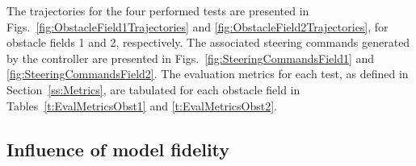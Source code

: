 \documentclass[12pt,twocolumn]{article}
\begin{document}
The trajectories for the four performed tests are presented in Figs.~\ref{fig:ObstacleField1Trajectories} and \ref{fig:ObstacleField2Trajectories}, for obstacle fields 1 and 2, respectively. The associated steering commands generated by the controller are presented in Figs.~\ref{fig:SteeringCommandsField1} and \ref{fig:SteeringCommandsField2}. 
The evaluation metrics for each test, as defined in Section~\ref{ss:Metrics}, are tabulated for each obstacle field in Tables~\ref{t:EvalMetricsObst1} and \ref{t:EvalMetricsObst2}. 

\subsection{Influence of model fidelity}
\end{document}
